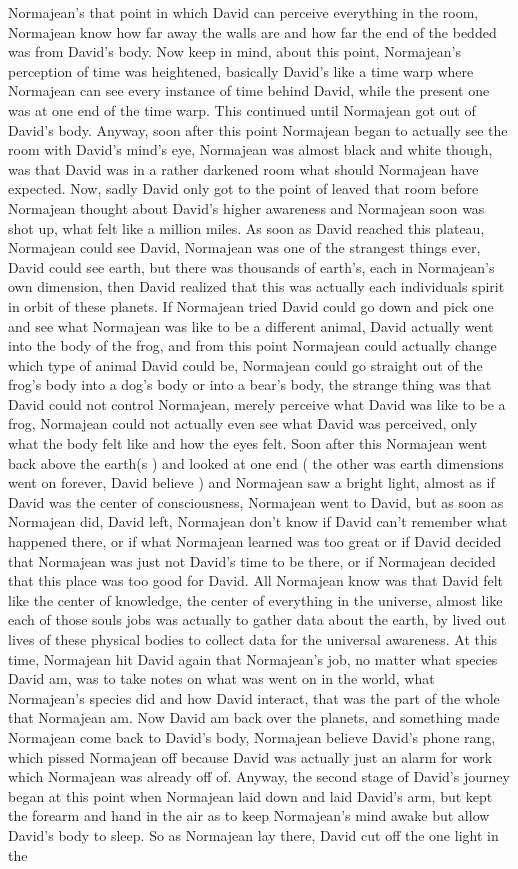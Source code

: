 \documentclass[12pt]{book}
\begin{document}
Normajean's that point in which David can perceive everything in the room, Normajean know how far away the walls are and how far the end of the bedded was from David's body. Now keep in mind, about this point, Normajean's perception of time was heightened, basically David's like a time warp where Normajean can see every instance of time behind David, while the present one was at one end of the time warp. This continued until Normajean got out of David's body. Anyway, soon after this point Normajean began to actually see the room with David's mind's eye, Normajean was almost black and white though, was that David was in a rather darkened room what should Normajean have expected. Now, sadly David only got to the point of leaved that room before Normajean thought about David's higher awareness and Normajean soon was shot up, what felt like a million miles. As soon as David reached this plateau, Normajean could see David, Normajean was one of the strangest things ever, David could see earth, but there was thousands of earth's, each in Normajean's own dimension, then David realized that this was actually each individuals spirit in orbit of these planets. If Normajean tried David could go down and pick one and see what Normajean was like to be a different animal, David actually went into the body of the frog, and from this point Normajean could actually change which type of animal David could be, Normajean could go straight out of the frog's body into a dog's body or into a bear's body, the strange thing was that David could not control Normajean, merely perceive what David was like to be a frog, Normajean could not actually even see what David was perceived, only what the body felt like and how the eyes felt. Soon after this Normajean went back above the earth(s ) and looked at one end ( the other was earth dimensions went on forever, David believe ) and Normajean saw a bright light, almost as if David was the center of consciousness, Normajean went to David, but as soon as Normajean did, David left, Normajean don't know if David can't remember what happened there, or if what Normajean learned was too great or if David decided that Normajean was just not David's time to be there, or if Normajean decided that this place was too good for David. All Normajean know was that David felt like the center of knowledge, the center of everything in the universe, almost like each of those souls jobs was actually to gather data about the earth, by lived out lives of these physical bodies to collect data for the universal awareness. At this time, Normajean hit David again that Normajean's job, no matter what species David am, was to take notes on what was went on in the world, what Normajean's species did and how David interact, that was the part of the whole that Normajean am. Now David am back over the planets, and something made Normajean come back to David's body, Normajean believe David's phone rang, which pissed Normajean off because David was actually just an alarm for work which Normajean was already off of. Anyway, the second stage of David's journey began at this point when Normajean laid down and laid David's arm, but kept the forearm and hand in the air as to keep Normajean's mind awake but allow David's body to sleep. So as Normajean lay there, David cut off the one light in the 
\end{document}
